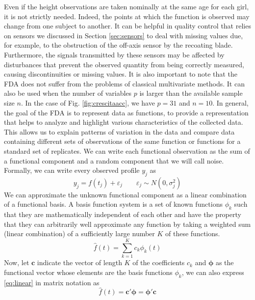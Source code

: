 Even if the height observations are taken nominally at the same age for each girl, it is not strictly needed. Indeed, the points at which the function is observed may change from one subject to another. It can be helpful in quality control that relies on sensors we discussed in Section \ref{sec:sensors} to deal with missing values due, for example, to the obstruction of the off-axis sensor by the recoating blade. Furthermore, the signals transmitted by these sensors may be affected by disturbances that prevent the observed quantity from being correctly measured, causing discontinuities or missing values. It is also important to note that the FDA does not suffer from the problems of classical multivariate methods. It can also be used when the number of variables $p$ is larger than the available sample size $n$. In the case of Fig. \ref{fig:crescitaacc}, we have $p=31$ and $n=10$. In general, the goal of the FDA is to represent data as functions, to provide a representation that helps to analyze and highlight various characteristics of the collected data. This allows us to explain patterns of variation in the data and compare data containing different sets of observations of the same function or functions for a standard set of replicates. We can write each functional observation as the sum of a functional component and a random component that we will call noise. Formally, we can write every observed profile $y_j$ as 
\begin{equation}
    y_j = f(t_j) + \varepsilon_j \qquad \varepsilon_j\sim N(0, \sigma_j^2)
\end{equation}
We can approximate the unknown functional component as a linear combination of a functional basis. A basis function system is a set of known functions $\phi_k$ such that they are mathematically independent of each other and have the property that they can arbitrarily well approximate any function by taking a weighted sum (linear combination) of a sufficiently large number $K$ of these functions.
\begin{equation}
\label{eq:linear}
    \hat{f}(t)=\sum_{k=1}^K c_k \phi_k(t)
\end{equation}
Now, let $\mathbf{c}$ indicate the vector of length $K$ of the coefficients $c_k$ and $\bm{\phi}$ as the functional vector whose elements are the basis functions $\phi_k$, we can also express \ref{eq:linear} in matrix notation as
\begin{equation}
\label{eq:matrice}
    \hat{f}(t)=\mathbf{c}'\bm{\phi}=\bm{\phi}'\mathbf{c}
\end{equation}
